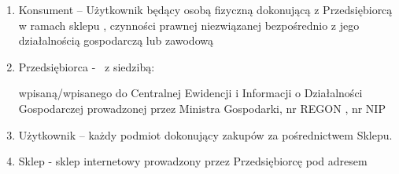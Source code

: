 

		\begin{enumerate}
			\item Konsument – Użytkownik będący osobą fizyczną dokonującą z Przedsiębiorcą w ramach sklepu \shopname, czynności prawnej niezwiązanej bezpośrednio z jego działalnością gospodarczą lub zawodową
			
			\item Przedsiębiorca - \companyname\, z siedzibą: \address\ wpisaną/wpisanego do Centralnej Ewidencji i Informacji o Działalności Gospodarczej prowadzonej przez Ministra Gospodarki, nr REGON \regon, nr NIP \nip
		
			\item Użytkownik – każdy podmiot dokonujący zakupów za pośrednictwem Sklepu.		
			
			\item Sklep - sklep internetowy prowadzony przez Przedsiębiorcę pod adresem \httpaddr			
		\end{enumerate}
		 

